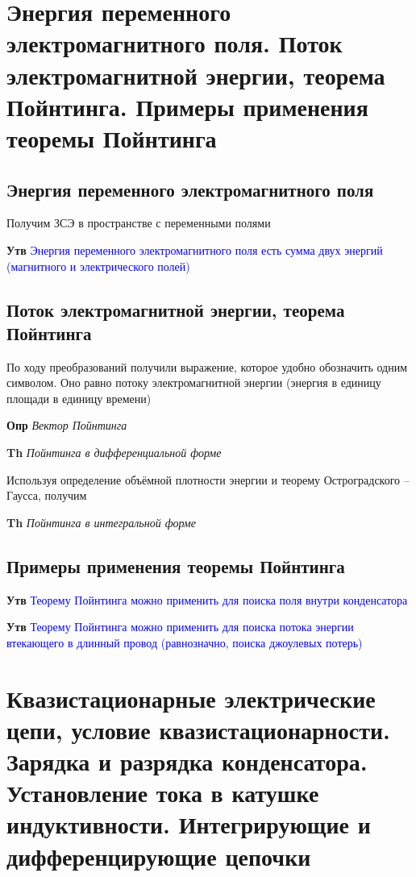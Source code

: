 \documentclass[a4paper, 14pt]{article}
\begin{document}
    \section{Энергия переменного электромагнитного поля.
    Поток электромагнитной энергии, теорема Пойнтинга.
    Примеры применения теоремы Пойнтинга}
    
    \subsection{Энергия переменного электромагнитного поля}
    
    Получим ЗСЭ в пространстве с переменными полями
    
    \textbf{Утв} \textcolor{blue}{Энергия переменного электромагнитного поля есть сумма двух энергий (магнитного и
    электрического полей)}
    
    \subsection{Поток электромагнитной энергии, теорема Пойнтинга}
    
    По ходу преобразований получили выражение, которое удобно обозначить одним символом.
    Оно равно потоку электромагнитной энергии (энергия в единицу площади в единицу времени)
    
    \textbf{Опр} \textit{Вектор Пойнтинга}
    
    \textbf{Th} \textit{Пойнтинга в дифференциальной форме}
    
    Используя определение объёмной плотности энергии и теорему Остроградского -- Гаусса, получим
    
    \textbf{Th} \textit{Пойнтинга в интегральной форме}
    
    \subsection{Примеры применения теоремы Пойнтинга}
    
    \textbf{Утв} \textcolor{blue}{Теорему Пойнтинга можно применить для поиска поля внутри конденсатора}
    
    \textbf{Утв} \textcolor{blue}{Теорему Пойнтинга можно применить для поиска потока энергии втекающего в
    длинный провод (равнозначно, поиска джоулевых потерь)}
    
    \section{Квазистационарные электрические цепи, условие квазистационарности.
    Зарядка и разрядка конденсатора.
    Установление тока в катушке индуктивности.
    Интегрирующие и дифференцирующие цепочки}
    
\end{document}
